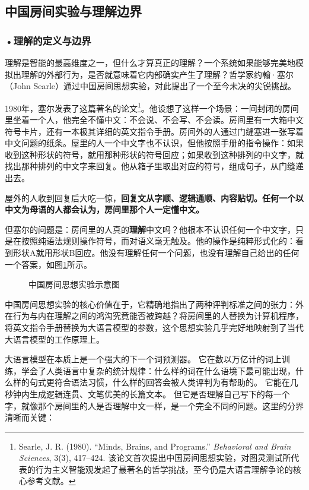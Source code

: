 \subsection{中国房间实验与理解边界}

\subsubsection*{\textbf{•理解的定义与边界}}

理解是智能的最高维度之一，但什么才算真正的理解？一个系统如果能够完美地模拟出理解的外部行为，是否就意味着它内部确实产生了理解？哲学家约翰·塞尔（John Searle）通过中国房间思想实验，对此提出了一个至今未决的尖锐挑战。

1980年，塞尔发表了这篇著名的论文\footnote{Searle, J. R. (1980). ``Minds, Brains, and Programs.'' \emph{Behavioral and Brain Sciences}, 3(3), 417--424. 该论文首次提出中国房间思想实验，对图灵测试所代表的行为主义智能观发起了最著名的哲学挑战，至今仍是大语言理解争论的核心参考文献。}。他设想了这样一个场景：一间封闭的房间里坐着一个人，他完全不懂中文：不会说、不会写、不会读。房间里有一大箱中文符号卡片，还有一本极其详细的英文指令手册。房间外的人通过门缝塞进一张写着中文问题的纸条。屋里的人一个中文字也不认识，但他按照手册的指令操作：如果收到这种形状的符号，就用那种形状的符号回应；如果收到这种排列的中文字，就找出那种排列的中文字来回复。他从箱子里取出对应的符号，组成句子，从门缝递出去。

屋外的人收到回复后大吃一惊，\textbf{回复文从字顺、逻辑通顺、内容贴切。任何一个以中文为母语的人都会认为，房间里那个人一定懂中文。}

但塞尔的问题是：房间里的人真的\textbf{理解}中文吗？他根本不认识任何一个中文字，只是在按照纯语法规则操作符号，而对语义毫无触及。他的操作是纯粹形式化的：看到形状A就用形状B回应。他没有理解任何一个问题，也没有理解自己给出的任何一个答案，如图\ref{fig:ch1_03}所示。

\begin{figure}[htbp]
\centering
{}
\caption{中国房间思想实验示意图}
\label{fig:ch1_03}
\end{figure}

中国房间思想实验的核心价值在于，它精确地指出了两种评判标准之间的张力：外在行为与内在理解之间的鸿沟究竟能否被跨越？将房间里的人替换为计算机程序，将英文指令手册替换为大语言模型的参数，这个思想实验几乎完好地映射到了当代大语言模型的工作原理上。

大语言模型在本质上是一个强大的下一个词预测器。
它在数以万亿计的词上训练，学会了人类语言中复杂的统计规律：什么样的词在什么语境下最可能出现，什么样的句式更符合语法习惯，什么样的回答会被人类评判为有帮助的。
它能在几秒钟内生成逻辑连贯、文笔优美的长篇文本。
但它是否理解自己写下的每一个字，就像那个房间里的人是否理解中文一样，是一个完全不同的问题。这里的分界清晰而关键：


